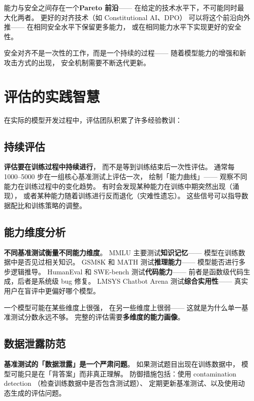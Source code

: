 能力与安全之间存在一个\textbf{Pareto 前沿}——
在给定的技术水平下，不可能同时最大化两者。
更好的对齐技术（如 Constitutional AI、DPO）
可以将这个前沿向外推——
在相同安全水平下保留更多能力，
或在相同能力水平下实现更好的安全性。

安全对齐不是一次性的工作，而是一个持续的过程——
随着模型能力的增强和新攻击方式的出现，
安全机制需要不断迭代更新。

\section{评估的实践智慧}

在实际的模型开发过程中，评估团队积累了许多经验教训：

\subsection{持续评估}

\textbf{评估要在训练过程中持续进行}，
而不是等到训练结束后一次性评估。
通常每 1000--5000 步在一组核心基准测试上评估一次，
绘制「能力曲线」——
观察不同能力在训练过程中的变化趋势。
有时会发现某种能力在训练中期突然出现（涌现），
或者某种能力随着训练进行反而退化（灾难性遗忘）。
这些信号可以指导数据配比和训练策略的调整。

\subsection{能力维度分析}

\textbf{不同基准测试衡量不同能力维度}。
MMLU 主要测试\textbf{知识记忆}——
模型在训练数据中是否见过相关知识。
GSM8K 和 MATH 测试\textbf{推理能力}——
模型能否进行多步逻辑推导。
HumanEval 和 SWE-bench 测试\textbf{代码能力}——
前者是函数级代码生成，后者是系统级 bug 修复。
LMSYS Chatbot Arena 测试\textbf{综合实用性}——
真实用户在盲评中更偏好哪个模型。

一个模型可能在某些维度上很强，
在另一些维度上很弱——
这就是为什么单一基准测试分数永远不够。
完整的评估需要\textbf{多维度的能力画像}。

\subsection{数据泄露防范}

\textbf{基准测试的「数据泄露」是一个严肃问题}。
如果测试题目出现在训练数据中，
模型可能只是在「背答案」而非真正理解。
防御措施包括：使用 contamination detection
（检查训练数据中是否包含测试题）、
定期更新基准测试、以及使用动态生成的评估问题。


